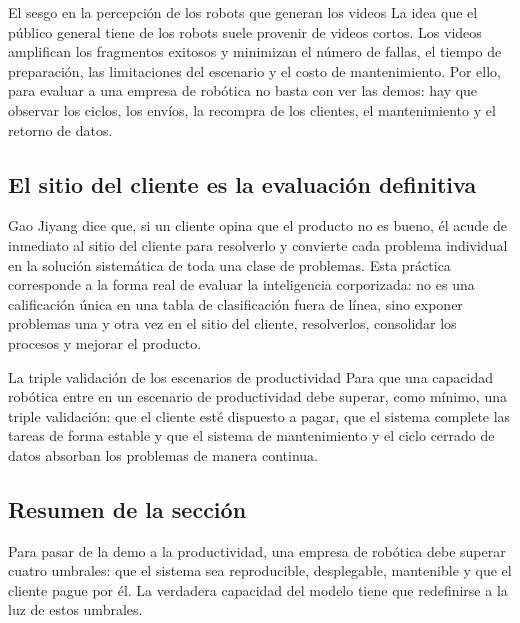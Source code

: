 \begin{warningbox}{El sesgo en la percepción de los robots que generan los videos}
La idea que el público general tiene de los robots suele provenir de videos cortos. Los videos amplifican los fragmentos exitosos y minimizan el número de fallas, el tiempo de preparación, las limitaciones del escenario y el costo de mantenimiento. Por ello, para evaluar a una empresa de robótica no basta con ver las demos: hay que observar los ciclos, los envíos, la recompra de los clientes, el mantenimiento y el retorno de datos.
\end{warningbox}

\subsection{El sitio del cliente es la evaluación definitiva}

Gao Jiyang dice que, si un cliente opina que el producto no es bueno, él acude de inmediato al sitio del cliente para resolverlo y convierte cada problema individual en la solución sistemática de toda una clase de problemas. Esta práctica corresponde a la forma real de evaluar la inteligencia corporizada: no es una calificación única en una tabla de clasificación fuera de línea, sino exponer problemas una y otra vez en el sitio del cliente, resolverlos, consolidar los procesos y mejorar el producto.

\begin{importantbox}{La triple validación de los escenarios de productividad}
Para que una capacidad robótica entre en un escenario de productividad debe superar, como mínimo, una triple validación: que el cliente esté dispuesto a pagar, que el sistema complete las tareas de forma estable y que el sistema de mantenimiento y el ciclo cerrado de datos absorban los problemas de manera continua.
\end{importantbox}

\subsection{Resumen de la sección}

Para pasar de la demo a la productividad, una empresa de robótica debe superar cuatro umbrales: que el sistema sea reproducible, desplegable, mantenible y que el cliente pague por él. La verdadera capacidad del modelo tiene que redefinirse a la luz de estos umbrales.
